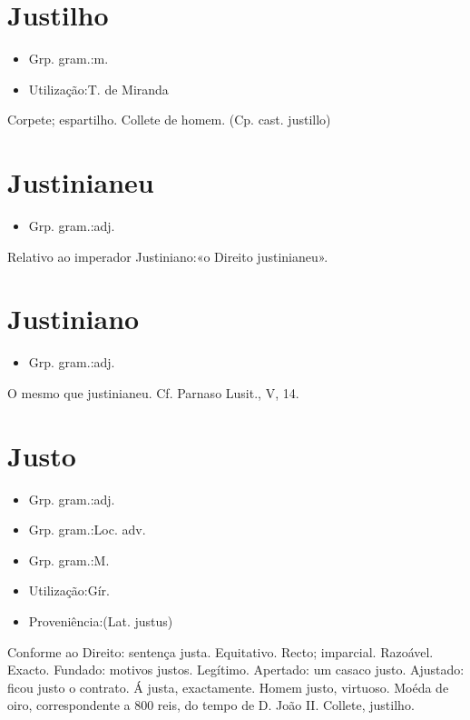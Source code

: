 \documentclass{article}
\begin{document}
\section{Justilho}
\begin{itemize}
\item {Grp. gram.:m.}
\end{itemize}
\begin{itemize}
\item {Utilização:T. de Miranda}
\end{itemize}
Corpete; espartilho.
Collete de homem.
(Cp. cast. \textunderscore justillo\textunderscore )
\section{Justinianeu}
\begin{itemize}
\item {Grp. gram.:adj.}
\end{itemize}
Relativo ao imperador Justiniano:«\textunderscore o Direito justinianeu\textunderscore ».
\section{Justiniano}
\begin{itemize}
\item {Grp. gram.:adj.}
\end{itemize}
O mesmo que \textunderscore justinianeu\textunderscore . Cf. \textunderscore Parnaso Lusit.\textunderscore , V, 14.
\section{Justo}
\begin{itemize}
\item {Grp. gram.:adj.}
\end{itemize}
\begin{itemize}
\item {Grp. gram.:Loc. adv.}
\end{itemize}
\begin{itemize}
\item {Grp. gram.:M.}
\end{itemize}
\begin{itemize}
\item {Utilização:Gír.}
\end{itemize}
\begin{itemize}
\item {Proveniência:(Lat. \textunderscore justus\textunderscore )}
\end{itemize}
Conforme ao Direito: \textunderscore sentença justa\textunderscore .
Equitativo.
Recto; imparcial.
Razoável.
Exacto.
Fundado: \textunderscore motivos justos\textunderscore .
Legítimo.
Apertado: \textunderscore um casaco justo\textunderscore .
Ajustado: \textunderscore ficou justo o contrato\textunderscore .
\textunderscore Á justa\textunderscore , exactamente.
Homem justo, virtuoso.
Moéda de oiro, correspondente a 800 reis, do tempo de D. João II.
Collete, justilho.
\end{document}
